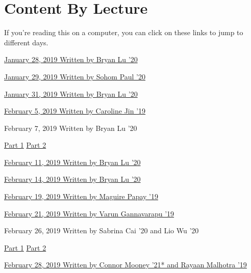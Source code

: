 \section*{Content By Lecture}
If you're reading this on a computer, you can click on these links to 
jump to different days. 

\hyperref[01-0128]{January 28, 2019 \dotfill Written by Bryan Lu '20}

\noindent 
\hyperref[02-0129]{January 29, 2019 \dotfill Written by Sohom Paul '20} 

\noindent 
\hyperref[03-0131]{January 31, 2019 \dotfill Written by Bryan Lu '20} 

\noindent
\hyperref[04-0205]{February 5, 2019 \dotfill Written by Caroline Jin '19} 

\noindent
February 7, 2019 \dotfill Written by Bryan Lu '20

\hyperref[05-0207-1]{Part 1} \qquad 
\hyperref[05-0207-2]{Part 2}

\noindent 
\hyperref[06-0211]{February 11, 2019 \dotfill Written by Bryan Lu '20}

\noindent
\hyperref[07-0214]{February 14, 2019 \dotfill Written by Bryan Lu '20}

\noindent
\hyperref[08-0219]{February 19, 2019 \dotfill Written by Maguire Papay '19}

\noindent
\hyperref[09-0221]{February 21, 2019 \dotfill Written by Varun Gannavarapu '19}

\noindent
February 26, 2019 \dotfill Written by Sabrina Cai '20 and Lio Wu '20

\hyperref[11-0226-1]{Part 1} \qquad 
\hyperref[11-0226-2]{Part 2}

\noindent
\hyperref[12-0228]{February 28, 2019 \dotfill Written by Connor Mooney '21* and Rayaan Malhotra '19}




